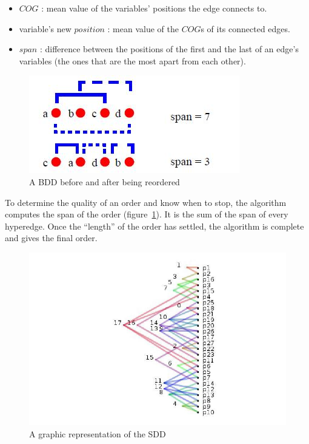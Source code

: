 \documentclass[12pt]{report}
\begin{document}
\begin{itemize}
  \item $COG$ : mean value of the variables' positions the edge connects to.
  \item variable's new $position$ : mean value of the $COG$s of its connected edges.
  \item $span$ : difference between the positions of the first and the last of an edge's variables (the ones that are the most apart from each other).
\end{itemize}

\begin{figure}[!h]
  \centering
  \includegraphics[scale=0.7]{images/force_span.jpg}
  \caption{A BDD before and after being reordered}
  \label{force_span}
\end{figure}

To determine the quality of an order and know when to stop, the algorithm computes the span of the order (figure~\ref{force_span}). It is the sum of the span of every hyperedge. Once the \enquote{length} of the order has settled, the algorithm is complete and gives the final order.

\begin{figure}[!h]
  \centering
  \includegraphics[scale=0.5]{images/representation_order.jpg}
  \caption{A graphic representation of the SDD}
  \label{order_graph}
\end{figure}
\end{document}
